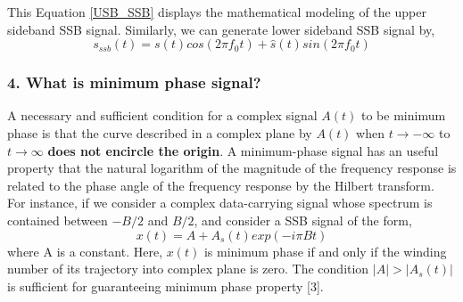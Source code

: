 This Equation \ref{USB_SSB} displays the mathematical modeling of the upper sideband SSB signal. Similarly, we can generate lower sideband SSB signal by,
\begin{equation}
{s}_{ssb}(t)=s(t)cos(2\pi f_0t)+\hat{s}(t)sin(2\pi f_0t)
\label{LSB_SSB}
\end{equation}

\subsubsection{4. What is minimum phase signal?}
A necessary and sufficient condition for a complex signal $A(t)$ to be minimum phase is that the curve described in a complex plane by $A(t)$ when $t\rightarrow -\infty$ to $t\rightarrow \infty$ \textbf{does not encircle the origin}. A minimum-phase signal has an useful property that the natural logarithm of the magnitude of the frequency response is related to the phase angle of the frequency response by the Hilbert transform.\\
For instance, if we consider a complex data-carrying signal whose spectrum is contained between $-B/2$ and $B/2$, and consider a SSB signal of the form,
\begin{equation}
x(t)=A + A_{s}(t)exp(-i\pi Bt)
\label{}
\end{equation}
where A is a constant. Here, $x(t)$ is minimum phase if and only if the winding number of its trajectory into complex plane is zero. The condition $|A|>|A_{s}(t)|$ is sufficient for guaranteeing minimum phase property [3]. 

